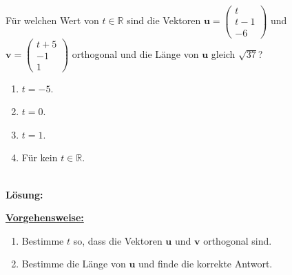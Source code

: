\subsection*{}
Für welchen Wert von $ t \in \mathbb{R} $ sind die Vektoren $ \textbf{u} = \begin{pmatrix}
t \\ t-1 \\ -6
\end{pmatrix} $ und $ \textbf{v} = \begin{pmatrix}
t+5 \\ -1 \\ 1
\end{pmatrix} $ orthogonal und die Länge von $ \textbf{u} $ gleich $ \sqrt{37} $?
\renewcommand{\labelenumi}{(\alph{enumi})}
\begin{enumerate}
	\item 
	$t = -5$.
	\item
	$t = 0$.
	\item
	$ t= 1 $.
	\item
	Für kein $ t \in \mathbb{R} $.	
\end{enumerate}
\ \\
\textbf{Lösung:}
\begin{mdframed}
\underline{\textbf{Vorgehensweise:}}
\renewcommand{\labelenumi}{\theenumi.}
\begin{enumerate}
\item Bestimme $ t $ so, dass die Vektoren $ \textbf{u} $ und $ \textbf{v} $ orthogonal sind.
\item Bestimme die Länge von  $ \textbf{u} $ und finde die korrekte Antwort.
\end{enumerate}
\end{mdframed}


